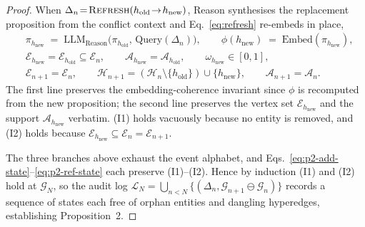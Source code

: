 \documentclass{article}
\begin{document}
\begin{proof}
When $\Delta_n\!=\!\textsc{Refresh}(h_{\mathrm{old}}\!\to\!h_{\mathrm{new}})$, Reason synthesises the replacement proposition from the conflict context and Eq.~\eqref{eq:refresh} re-embeds in place,
\begin{equation}
\begin{aligned}
&\pi_{h_{\mathrm{new}}}\;=\;\mathrm{LLM}_{\mathrm{Reason}}\!\bigl(\pi_{h_{\mathrm{old}}},\,\mathrm{Query}(\Delta_n)\bigr),\qquad \phi(h_{\mathrm{new}})\;=\;\mathrm{Embed}(\pi_{h_{\mathrm{new}}}),\\[2pt]
&\mathcal{E}_{h_{\mathrm{new}}}\!=\!\mathcal{E}_{h_{\mathrm{old}}}\!\subseteq\!\mathcal{E}_n,\qquad \mathcal{A}_{h_{\mathrm{new}}}\!=\!\mathcal{A}_{h_{\mathrm{old}}},\qquad \omega_{h_{\mathrm{new}}}\!\in\![0,1],\\[2pt]
&\mathcal{E}_{n+1}\!=\!\mathcal{E}_n,\qquad \mathcal{H}_{n+1}\!=\!(\mathcal{H}_n\!\setminus\!\{h_{\mathrm{old}}\})\!\cup\!\{h_{\mathrm{new}}\},\qquad \mathcal{A}_{n+1}\!=\!\mathcal{A}_n.
\end{aligned}
\label{eq:p2-ref-state}
\end{equation}
The first line preserves the embedding-coherence invariant since $\phi$ is recomputed from the new proposition; the second line preserves the vertex set $\mathcal{E}_{h_{\mathrm{new}}}$ and the support $\mathcal{A}_{h_{\mathrm{new}}}$ verbatim. (I1) holds vacuously because no entity is removed, and (I2) holds because $\mathcal{E}_{h_{\mathrm{new}}}\!\subseteq\!\mathcal{E}_n\!=\!\mathcal{E}_{n+1}$.

The three branches above exhaust the event alphabet, and Eqs.~\eqref{eq:p2-add-state}--\eqref{eq:p2-ref-state} each preserve (I1)--(I2). Hence by induction (I1) and (I2) hold at $\mathcal{G}_N$, so the audit log $\mathcal{L}_N\!=\!\bigcup_{n<N}\!\{(\Delta_n,\mathcal{G}_{n+1}\!\ominus\!\mathcal{G}_n)\}$ records a sequence of states each free of orphan entities and dangling hyperedges, establishing Proposition~2.
\end{proof}
\end{document}
